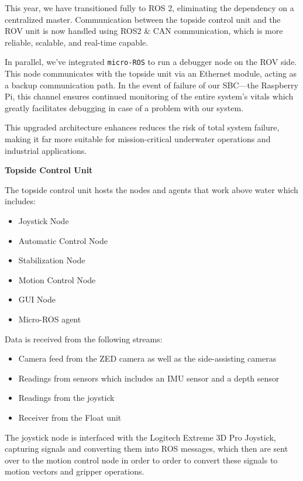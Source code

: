 \hspace{10pt} This year, we have transitioned fully to ROS 2, eliminating the dependency on a centralized master. Communication between the topside control unit and the ROV unit is now handled using ROS2 \& CAN communication, which is more reliable, scalable, and real-time capable.

\hspace{10pt} In parallel, we’ve integrated \texttt{micro-ROS} to run a debugger node on the ROV side. This node communicates with the topside unit via an Ethernet module, acting as a backup communication path. In the event of failure of our SBC—the Raspberry Pi, this channel ensures continued monitoring of the entire system's vitals which greatly facilitates debugging in case of a problem with our system.

\hspace{10pt} This upgraded architecture enhances reduces the risk of total system failure, making it far more suitable for mission-critical underwater operations and industrial applications.

\vspace{0.2cm}
\textbf{Topside Control Unit}

The topside control unit hosts the nodes and agents that work above water which includes:
\vspace{-0.3\baselineskip}
\begin{itemize}
    \setlength{\itemsep}{0pt}
    \item Joystick Node
    \item Automatic Control Node
    \item Stabilization Node
    \item Motion Control Node 
    \item GUI Node
    \item Micro-ROS agent
\end{itemize}
Data is received from the following streams:
\vspace{-0.5\baselineskip}
\begin{itemize}
    \setlength{\itemsep}{0pt}
    \item Camera feed from the ZED camera as well as the side-assisting cameras
    \item Readings from sensors which includes an IMU sensor and a depth sensor
    \item Readings from the joystick
    \item Receiver from the Float unit
\end{itemize}
The joystick node is interfaced with the Logitech Extreme 3D Pro Joystick, capturing signals and converting them into ROS messages, which then are sent over to the motion control node in order to order to convert these signals to motion vectors and gripper operations. 

